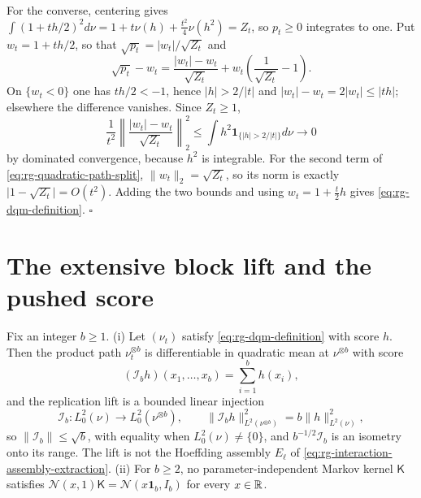 For the converse, centering gives
\(\int(1+th/2)^2d\nu=1+t\nu(h)+\tfrac{t^2}4\nu(h^2)=Z_t\), so \(p_t\geq0\) integrates
to one. Put \(w_t=1+th/2\), so that \(\sqrt{p_t}=\lvert w_t\rvert/\sqrt{Z_t}\) and
\begin{equation}
\sqrt{p_t}-w_t
=\frac{\lvert w_t\rvert-w_t}{\sqrt{Z_t}}
+w_t\left(\frac1{\sqrt{Z_t}}-1\right).
\label{eq:rg-quadratic-path-split}
\end{equation}
On \(\{w_t<0\}\) one has \(th/2<-1\), hence \(\lvert h\rvert>2/\lvert t\rvert\) and
\(\lvert w_t\rvert-w_t=2\lvert w_t\rvert\leq\lvert th\rvert\); elsewhere the difference
vanishes. Since \(Z_t\geq1\),
\begin{equation}
\frac1{t^2}\left\lVert
\frac{\lvert w_t\rvert-w_t}{\sqrt{Z_t}}
\right\rVert_2^2
\leq\int h^2\mathbf 1_{\{\lvert h\rvert>2/\lvert t\rvert\}}d\nu
\longrightarrow0
\label{eq:rg-quadratic-path-tail}
\end{equation}
by dominated convergence, because \(h^2\) is integrable. For the second term of
\eqref{eq:rg-quadratic-path-split}, \(\lVert w_t\rVert_2=\sqrt{Z_t}\), so its norm is
exactly \(\lvert1-\sqrt{Z_t}\rvert=O(t^2)\). Adding the two bounds and using
\(w_t=1+\tfrac t2h\) gives \eqref{eq:rg-dqm-definition}. \hfill$\square$

\section{The extensive block lift and the pushed score}

Fix an integer \(b\geq1\). (i) Let \((\nu_t)\) satisfy \eqref{eq:rg-dqm-definition}
with score \(h\). Then the product path \(\nu_t^{\otimes b}\) is differentiable in
quadratic mean at \(\nu^{\otimes b}\) with score
\begin{equation}
(\mathscr I_bh)(x_1,\dots,x_b)=\sum_{i=1}^bh(x_i),
\label{eq:rg-score-replication}
\end{equation}
and the replication lift is a bounded linear injection
\begin{equation}
\mathscr I_b:L^2_0(\nu)\longrightarrow L^2_0(\nu^{\otimes b}),
\qquad
\lVert\mathscr I_bh\rVert_{L^2(\nu^{\otimes b})}^2
=b\lVert h\rVert_{L^2(\nu)}^2,
\label{eq:rg-score-replication-norm}
\end{equation}
so \(\lVert\mathscr I_b\rVert\leq\sqrt b\), with equality when \(L^2_0(\nu)\neq\{0\}\), and
\(b^{-1/2}\mathscr I_b\) is an isometry onto its range. The lift is not the Hoeffding assembly \(E_\ell\) of
\eqref{eq:rg-interaction-assembly-extraction}.
(ii) For \(b\geq2\), no parameter-independent Markov kernel \(\mathsf K\) satisfies
\(\mathcal N(x,1)\mathsf K=\mathcal N(x\mathbf 1_b,I_b)\) for every \(x\in\mathbb R\).

